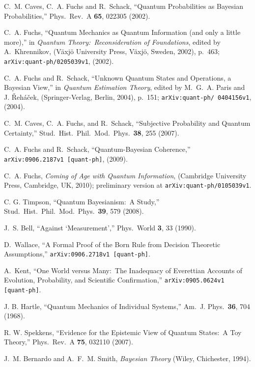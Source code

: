 \begin{thebibliography}{100}

C.~M. Caves, C.~A. Fuchs and R.~Schack, ``Quantum Probabilities as
Bayesian Probabilities,'' Phys.\ Rev.\ A {\bf 65}, 022305 (2002).

C.~A. Fuchs, ``Quantum Mechanics as Quantum Information (and only a
little more),'' in {\sl Quantum Theory:\ Reconsideration of
Foundations}, edited by A.~Khrennikov, (V\"axj\"o University Press,
V\"axj\"o, Sweden, 2002), p.~463; {\tt arXiv:quant-ph/0205039v1}, (2002).

C.~A. Fuchs and R.~Schack, ``Unknown Quantum States and Operations, a
Bayesian View,'' in {\sl Quantum Estimation Theory}, edited by M.~G.~A.
Paris and J. \v{R}eh\'a\v{c}ek, (Springer-Verlag, Berlin, 2004),
p.~151; {\tt arXiv:quant-ph/ 0404156v1}, (2004).

C.~M. Caves, C.~A. Fuchs, and R.~Schack, ``Subjective Probability and
Quantum Certainty,'' Stud.\ Hist.\ Phil.\ Mod.\ Phys.\ {\bf 38}, 255 (2007).

C.~A. Fuchs and R.~Schack, ``Quantum-Bayesian Coherence,''  {\tt arXiv:0906.2187v1 [quant-ph]}, (2009).

C.~A. Fuchs, {\sl Coming of Age with Quantum Information}, (Cambridge University Press, Cambridge, UK, 2010); preliminary version at {\tt arXiv:quant-ph/0105039v1}.

C. G. Timpson, ``Quantum Bayesianism:\ A Study,'' Stud.\ Hist.\ Phil.\ Mod.\ Phys.\ {\bf 39}, 579 (2008).

J.~S. Bell, ``Against `Measurement','' Phys.\ World {\bf 3}, 33 (1990).

D.~Wallace, ``A Formal Proof of the Born Rule from Decision Theoretic Assumptions,'' {\tt arXiv:0906.2718v1 [quant-ph]}.

A.~Kent, ``One World versus Many:\ The Inadequacy of Everettian Accounts of Evolution, Probability, and Scientific Confirmation,''  {\tt 	 arXiv:0905.0624v1 [quant-ph]}.

J. B. Hartle, ``Quantum Mechanics of Individual Systems,'' Am.\ J. Phys.\ {\bf 36}, 704 (1968).

R. W. Spekkens, ``Evidence for the Epistemic View of Quantum States:\ A Toy Theory,'' Phys.\ Rev.\ A {\bf 75}, 032110 (2007).

J.~M. Bernardo and A.~F.~M. Smith, {\sl Bayesian Theory} (Wiley, Chichester, 1994).


\end{thebibliography}

